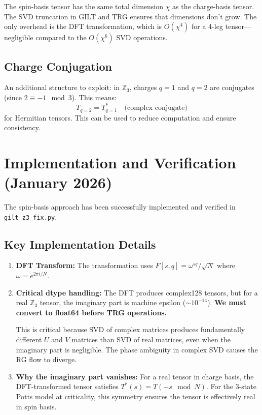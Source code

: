 \documentclass{article}
\begin{document}
The spin-basis tensor has the same total dimension $\chi$ as the charge-basis tensor. The SVD truncation in GILT and TRG ensures that dimensions don't grow. The only overhead is the DFT transformation, which is $O(\chi^4)$ for a 4-leg tensor---negligible compared to the $O(\chi^6)$ SVD operations.

\subsection{Charge Conjugation}

An additional structure to exploit: in $\mathbb{Z}_3$, charges $q=1$ and $q=2$ are conjugates (since $2 \equiv -1 \mod 3$). This means:
\begin{equation}
    T_{q=2} = T_{q=1}^* \quad \text{(complex conjugate)}
\end{equation}
for Hermitian tensors. This can be used to reduce computation and ensure consistency.

\section{Implementation and Verification (January 2026)}

The spin-basis approach has been successfully implemented and verified in \texttt{gilt\_z3\_fix.py}.

\subsection{Key Implementation Details}

\begin{enumerate}
    \item \textbf{DFT Transform:} The transformation uses $F[s,q] = \omega^{sq}/\sqrt{N}$ where $\omega = e^{2\pi i/N}$.

    \item \textbf{Critical dtype handling:} The DFT produces complex128 tensors, but for a real $\mathbb{Z}_3$ tensor, the imaginary part is machine epsilon ($\sim 10^{-14}$). \textbf{We must convert to float64 before TRG operations.}

    This is critical because SVD of complex matrices produces fundamentally different $U$ and $V$ matrices than SVD of real matrices, even when the imaginary part is negligible. The phase ambiguity in complex SVD causes the RG flow to diverge.

    \item \textbf{Why the imaginary part vanishes:} For a real tensor in charge basis, the DFT-transformed tensor satisfies $T^*(s) = T(-s \mod N)$. For the 3-state Potts model at criticality, this symmetry ensures the tensor is effectively real in spin basis.
\end{enumerate}
\end{document}
